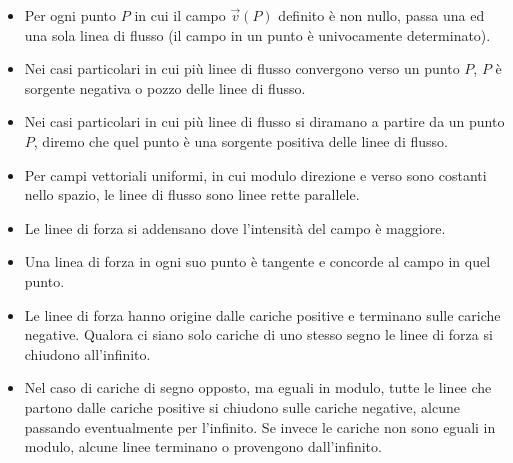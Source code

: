 \begin{itemize}
	\item Per ogni punto $P$ in cui il campo $\vec{v}(P)$ definito è non nullo, passa una ed una sola linea di flusso (il campo in un punto è univocamente determinato).
	\item Nei casi particolari in cui più linee di flusso convergono verso un punto $P$, $P$ è sorgente negativa o pozzo delle linee di flusso.
	\item Nei casi particolari in cui più linee di flusso si diramano a partire da un punto $P$, diremo che quel punto è una sorgente positiva delle linee di flusso.
	\item Per campi vettoriali uniformi, in cui modulo direzione e verso sono costanti nello spazio, le linee di flusso sono linee rette parallele.
	\item Le linee di forza si addensano dove l'intensità del campo è maggiore.
	\item Una linea di forza in ogni suo punto è tangente e concorde al campo in quel punto.
	\item Le linee di forza hanno origine dalle cariche positive e terminano sulle cariche negative. Qualora ci siano solo cariche di uno stesso segno le linee di forza si chiudono all'infinito.
	\item Nel caso di cariche di segno opposto, ma eguali in modulo, tutte le linee che partono dalle cariche positive si chiudono sulle cariche negative, alcune passando eventualmente per l'infinito. Se invece le cariche non sono eguali in modulo, alcune linee terminano o provengono dall'infinito.
\end{itemize}

